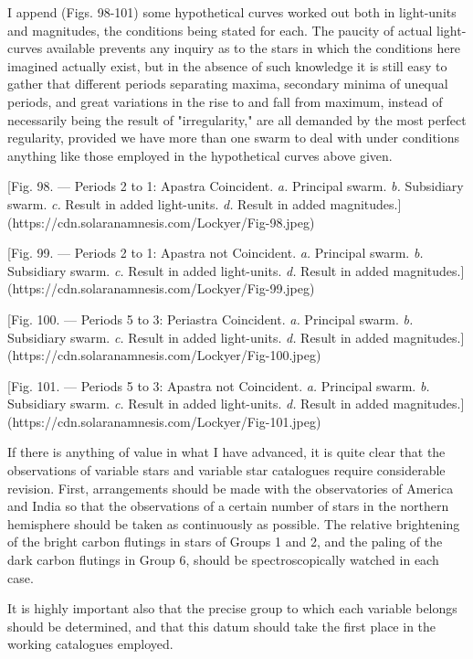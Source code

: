 \documentclass[a4paper, 12pt, oneside, polutonikogreek, english]{article}
\begin{document}
I append (Figs. 98-101) some hypothetical curves worked out both in light-units and magnitudes, the conditions being stated for each. The paucity of actual light-curves available prevents any inquiry as to the stars in which the conditions here imagined actually exist, but in the absence of such knowledge it is still easy to gather that different periods separating maxima, secondary minima of unequal periods, and great variations in the rise to and fall from maximum, instead of necessarily being the result of "irregularity," are all demanded by the most perfect regularity, provided we have more than one swarm to deal with under conditions anything like those employed in the hypothetical curves above given.

[Fig. 98. --- Periods 2 to 1: Apastra Coincident. \emph{a.} Principal swarm. \emph{b.} Subsidiary swarm. \emph{c.} Result in added light-units. \emph{d.} Result in added magnitudes.](https://cdn.solaranamnesis.com/Lockyer/Fig-98.jpeg)

[Fig. 99. --- Periods 2 to 1: Apastra not Coincident. \emph{a.} Principal swarm. \emph{b.} Subsidiary swarm. \emph{c.} Result in added light-units. \emph{d.} Result in added magnitudes.](https://cdn.solaranamnesis.com/Lockyer/Fig-99.jpeg)

[Fig. 100. --- Periods 5 to 3: Periastra Coincident. \emph{a.} Principal swarm. \emph{b.} Subsidiary swarm. \emph{c.} Result in added light-units. \emph{d.} Result in added magnitudes.](https://cdn.solaranamnesis.com/Lockyer/Fig-100.jpeg)

[Fig. 101. --- Periods 5 to 3: Apastra not Coincident. \emph{a.} Principal swarm. \emph{b.} Subsidiary swarm. \emph{c.} Result in added light-units. \emph{d.} Result in added magnitudes.](https://cdn.solaranamnesis.com/Lockyer/Fig-101.jpeg)

If there is anything of value in what I have advanced, it is quite clear that the observations of variable stars and variable star catalogues require considerable revision. First, arrangements should be made with the observatories of America and India so that the observations of a certain number of stars in the northern hemisphere should be taken as continuously as possible. The relative brightening of the bright carbon flutings in stars of Groups 1 and 2, and the paling of the dark carbon flutings in Group 6, should be spectroscopically watched in each case.

It is highly important also that the precise group to which each variable belongs should be determined, and that this datum should take the first place in the working catalogues employed.
\end{document}

